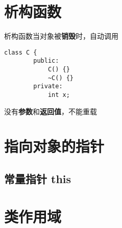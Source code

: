 \section{析构函数}

析构函数当对象被\textbf{销毁}时，自动调用

\begin{lstlisting}[frame=shadowbox]
    class C {
        public:
            C() {}
            ~C() {}
        private:
            int x;
\end{lstlisting}

没有\textbf{参数}和\textbf{返回值}，不能重载

\section{指向对象的指针}



\subsection{常量指针 this}

\section{类作用域}

\newpage